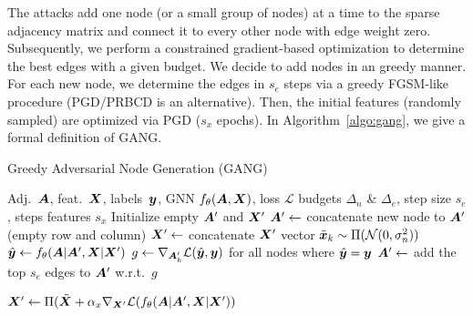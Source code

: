 \documentclass[sigconf,authordraft]{acmart}
\newcommand{\adj}{\mA}
\newcommand{\features}{\mX}
\begin{document}
The attacks add one node (or a small group of nodes) at a time to the sparse adjacency matrix and connect it to every other node with edge weight zero. Subsequently, we perform a constrained gradient-based optimization to determine the best edges with a given budget. We decide to add nodes in an greedy manner. For each new node, we determine the edges in \(s_e\) steps via a greedy FGSM-like procedure (PGD/PRBCD is an alternative). Then, the initial features (randomly sampled) are optimized via PGD (\(s_x\) epochs). In Algorithm~\ref{algo:gang}, we give a formal definition of GANG.

\begin{algorithm}[t]
  \small
  \caption{Greedy Adversarial Node Generation (GANG)}
  \label{algo:gang}
  \begin{algorithmic}[1]
     Adj.\ \(\adj\), feat.\ \(\features\), labels\ \({\bm{y}}\), GNN \(f_{\theta}(\adj, \features)\), loss \(\mathcal{L}\)
     budgets \(\Delta_n\) \& \(\Delta_e\), step size \(s_e\), steps features \(s_x\)
    \STATE Initialize empty \(\adj^\prime\) and \(\features^\prime\)
    \STATE \(\adj^\prime \leftarrow\) concatenate new node to \(\adj^\prime\) (empty row and column)
    \STATE \(\features^\prime \leftarrow\) concatenate \(\features^\prime\) vector \(\tilde{{\bm{x}}}_k \sim \Pi(\mathcal{N}(0, \sigma_n^2))\)
    \STATE \(\hat{\vy} \leftarrow f_{\theta}(\adj | \adj^\prime, \features | \features^\prime)\)
    \STATE \(g \leftarrow \nabla_{\adj^\prime_k} \mathcal{L}(\hat{\vy}, \vy)\) for all nodes where \(\hat{{\bm{y}}} = {\bm{y}}\)
    \STATE \(\adj^\prime \leftarrow\) add the top \(s_e\) edges to \(\adj^\prime\) w.r.t.~\(g\)
    \ENDFOR


    \STATE \(\features^\prime \leftarrow \Pi(\tilde{\features} + \alpha_x \nabla_{\features^\prime} \mathcal{L}(f_{\theta}(\adj | \adj^\prime, \features | \features^\prime))\)
    \ENDFOR
    \ENDFOR
  \end{algorithmic}
\end{algorithm}
\end{document}

